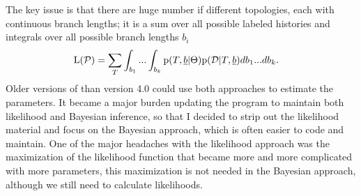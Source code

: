  The key issue is that there are huge number if different topologies, each with continuous branch lengths; it  is a sum over all possible labeled histories and integrals over all possible branch lengths $b_i$
\begin{align}
{\mathrm L}(\mathcal{P}) &= \sum_T \int_{b_1} ... \int_{b_k} {\mathrm p}(T,\underline{b} | \Theta) {\mathrm p}({ \mathcal D} | T,\underline{b}) db_1...db_k.
\end{align}
Older versions of \migrate than version 4.0 could use both approaches to estimate the parameters. It became a major burden updating the program to maintain both likelihood and Bayesian inference, so that I decided to strip out the likelihood material and focus on the Bayesian approach, which is often easier to code and maintain. One of the major headaches with the likelihood approach was the maximization of the likelihood function that became more and more complicated with more parameters, this maximization is not needed in the Bayesian approach, although we still need to calculate likelihoods.


